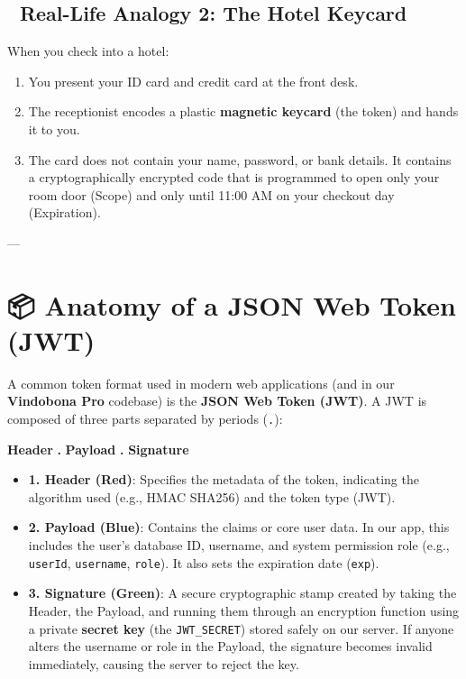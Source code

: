 \documentclass[11pt,a4paper]{article}
\begin{document}
\subsection{🏨 Real-Life Analogy 2: The Hotel Keycard}
When you check into a hotel:
\begin{enumerate}
    \item You present your ID card and credit card at the front desk.
    \item The receptionist encodes a plastic \textbf{magnetic keycard} (the token) and hands it to you.
    \item The card does not contain your name, password, or bank details. It contains a cryptographically encrypted code that is programmed to open only your room door (Scope) and only until 11:00 AM on your checkout day (Expiration).
\end{enumerate}

---

\section{📦 Anatomy of a JSON Web Token (JWT)}
A common token format used in modern web applications (and in our \textbf{Vindobona Pro} codebase) is the \textbf{JSON Web Token (JWT)}. A JWT is composed of three parts separated by periods (\texttt{.}):

\begin{center}
    \textbf{\textcolor{headerred}{Header}} \textbf{.} \textbf{\textcolor{payloadblue}{Payload}} \textbf{.} \textbf{\textcolor{signgreen}{Signature}}
\end{center}

\begin{tcolorbox}[colback=bglight, colframe=accentblue, title=JWT Structure Breakdown]
\begin{itemize}[leftmargin=*]
    \item \textbf{\textcolor{headerred}{1. Header (Red)}}: Specifies the metadata of the token, indicating the algorithm used (e.g., HMAC SHA256) and the token type (JWT).
    \item \textbf{\textcolor{payloadblue}{2. Payload (Blue)}}: Contains the claims or core user data. In our app, this includes the user's database ID, username, and system permission role (e.g., \texttt{userId}, \texttt{username}, \texttt{role}). It also sets the expiration date (\texttt{exp}).
    \item \textbf{\textcolor{signgreen}{3. Signature (Green)}}: A secure cryptographic stamp created by taking the Header, the Payload, and running them through an encryption function using a private \textbf{secret key} (the \texttt{JWT\_SECRET}) stored safely on our server. If anyone alters the username or role in the Payload, the signature becomes invalid immediately, causing the server to reject the key.
\end{itemize}
\end{tcolorbox}
\end{document}
